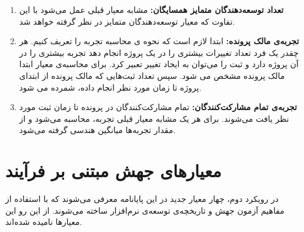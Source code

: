 \begin{enumerate}
\item
\textbf{تعداد توسعه‌دهندگان متمایز همسایگان:}
مشابه معیار قبلی عمل می‌شود با این تفاوت که معیار توسعه‌دهندگان متمایز در نظر گرفته خواهد شد.
\item
\textbf{تجربه‌ی مالک پرونده:}
 ابتدا لازم است که نحوه ی محاسبه تجربه را تعریف کنیم. هر چقدر یک فرد تعداد تغییرات بیشتری را در یک پروژه انجام دهد تجربه بیشتری را در آن پروژه دارد و ثبت را می‌توان به ایجاد تغییر تعبیر کرد. برای محاسبه‌ی معیار ابتدا مالک پرونده مشخص می شود. سپس تعداد ثبت‌هایی که مالک پرونده از ابتدای پروژه تا زمان مورد نظر انجام داده، شمرده می شود.
\item
\textbf{تجربه‌ی تمام مشارکت‌کنندگان:}
تمام مشارکت‌کنندگان در پرونده تا زمان ثبت مورد نظر یافت می‌شوند. برای هر یک مشابه معیار قبلی تجربه، محاسبه می‌شود و از مقدار تجربه‌ها میانگین هندسی گرفته می‌شود. 

\end{enumerate}


\section{معیارهای جهش مبتنی بر فرآیند}
\label{sec:method-phase-two}
در رویکرد دوم، چهار معیار جدید در این پایانامه معرفی می‌شوند که با استفاده از مفاهیم آزمون جهش و تاریخچه‌ی توسعه‌ی نرم‌افزار ساخته می‌شوند. از این رو این معیارها   نامیده شده‌اند. 

